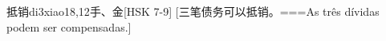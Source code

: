 \begin{EntryWithPhonetic}{抵销}{di3xiao1}{8,12}{⼿、⾦}[HSK 7-9]
  [三笔债务可以抵销。===As três dívidas podem ser compensadas.]
\end{EntryWithPhonetic}
